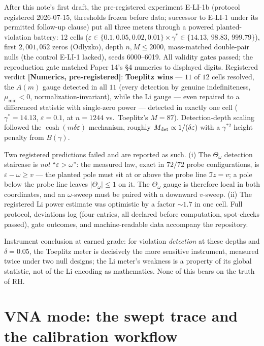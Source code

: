 \documentclass[11pt]{article}
\theoremstyle{remark}
\newcommand{\gr}[1]{\textbf{[#1]}} %
\begin{document}
After this note's first draft, the pre-registered experiment E-LI-1b (protocol registered
2026-07-15, thresholds frozen before data; successor to E-LI-1 under its permitted
follow-up clause) put all three meters through a powered planted-violation battery:
12 cells ($\varepsilon\in\{0.1,0.05,0.02,0.01\}\times\gamma^*\in\{14.13,\,98.83,\,999.79\}$),
first $2{,}001{,}052$ zeros (Odlyzko), depth $n,M\le2000$, mass-matched double-pair nulls
(the control E-LI-1 lacked), seeds 6000--6019. All validity gates passed; the reproduction
gate matched Paper 14's \S4 numerics to displayed digits. Registered verdict
\gr{Numerics, pre-registered}: \textbf{Toeplitz wins} --- $11$ of $12$ cells resolved, the
$A(m)$ gauge detected in all $11$ (every detection by genuine indefiniteness,
$\mu_{\min}<0$, normalization-invariant), while the Li gauge --- even repaired to a
differenced statistic with single-zero power --- detected in exactly one cell
($\gamma^*=14.13$, $\varepsilon=0.1$, at $n=1244$ vs.\ Toeplitz's $M=87$). Detection-depth
scaling followed the $\cosh(m\delta\varepsilon)$ mechanism, roughly
$M_{\rm det}\propto 1/(\delta\varepsilon)$ with a $\gamma^{*2}$ height penalty from
$B(\gamma)$.

Two registered predictions failed and are reported as such. (i) The $\Theta_\omega$
detection staircase is \emph{not} ``$\varepsilon>\omega$'': the measured law, exact in
$72/72$ probe configurations, is $\varepsilon-\omega\ge v$ --- the planted pole must sit at
or above the probe line $\Im z=v$; a pole below the probe line leaves $|\Theta_\omega|\le1$
on it. The $\Theta_\omega$ gauge is therefore local in both coordinates, and an
$\omega$-sweep must be paired with a downward $v$-sweep. (ii) The registered Li power
estimate was optimistic by a factor $\sim1.7$ in one cell. Full protocol, deviations log
(four entries, all declared before computation, spot-checks passed), gate outcomes, and
machine-readable data accompany the repository.

Instrument conclusion at earned grade: for violation \emph{detection} at these depths and
$\delta=0.05$, the Toeplitz meter is decisively the more sensitive instrument, measured
twice under two null designs; the Li meter's weakness is a property of its global statistic,
not of the Li encoding as mathematics. None of this bears on the truth of RH.

\section{VNA mode: the swept trace and the calibration workflow}
\end{document}
